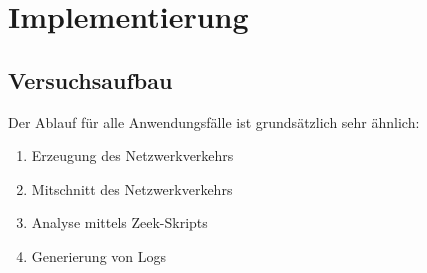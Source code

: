 
\chapter{Implementierung}%
\label{cha:implementation}





\section{Versuchsaufbau}
Der Ablauf für alle Anwendungsfälle ist grundsätzlich sehr ähnlich:
\begin{enumerate}
\item{Erzeugung des Netzwerkverkehrs}
\item{Mitschnitt des Netzwerkverkehrs}
\item{Analyse mittels Zeek-Skripts}
\item{Generierung von Logs}
\end{enumerate}
